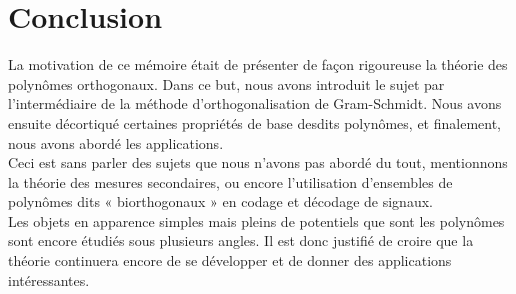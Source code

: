 \chapter{Conclusion}
La motivation de ce mémoire était de présenter de façon rigoureuse la théorie des polynômes orthogonaux. Dans ce but, nous avons introduit le sujet par l'intermédiaire de la méthode d'orthogonalisation de Gram-Schmidt. Nous avons ensuite décortiqué certaines propriétés de base desdits polynômes, et finalement, nous avons abordé les applications.
\\Ceci est sans parler des sujets que nous n'avons pas abordé du tout, mentionnons la théorie des mesures secondaires, ou encore l'utilisation d'ensembles de polynômes dits « biorthogonaux » en codage et décodage de signaux.
\\Les objets en apparence simples mais pleins de potentiels que sont les polynômes sont encore étudiés sous plusieurs angles. Il est donc justifié de croire que la théorie continuera encore de se développer et de donner des applications intéressantes.
